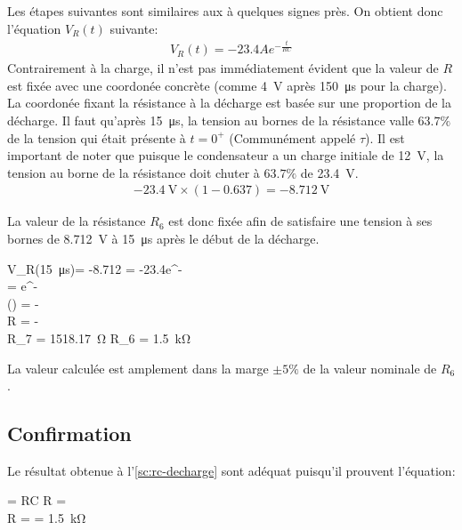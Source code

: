 \documentclass[a11paper, 11pt]{article}
\newcommand{\vrt}{V_R(t)}
\begin{document}
\begin{appendix}
	Les étapes suivantes sont similaires aux 
	à quelques signes près.
	On obtient donc l'équation $V_R(t)$ suivante:
	\begin{gather}
		\vrt = -23.4Ae^{-\frac{t}{RC}} \label{eq:rc-decharge-final}
	\end{gather}
	Contrairement à la charge, il n'est pas immédiatement évident que la valeur de $R$ est
	fixée avec une coordonée concrète (comme \SI{4}{\V} après \SI{150}{\us} pour la charge).
	La coordonée fixant la résistance à la décharge est basée sur une proportion de la décharge.
	Il faut qu'après \SI{15}{\us}, la tension au bornes de la résistance valle $63.7\%$ de la
	tension qui était présente à $t=0^+$ (Communément appelé $\tau$).
	Il est important de noter que puisque le condensateur a
	un charge initiale de \SI{12}{\V}, la tension au borne de la résistance doit chuter à
	$63.7\%$ de \SI{23.4}{\V}.
	\begin{gather}
		\SI{-23.4}{\V} \times (1-0.637) = \SI{-8.712}{\V}
	\end{gather}

	La valeur de la résistance $R_6$ est donc fixée afin de satisfaire une tension à ses bornes
	de \SI{8.712}{\V} à \SI{15}{\us} après le début de la décharge.
	\begin{DispWithArrows}[format=c]
		V_R(\SI{15}{\us})= -8.712 = -23.4e^{-}\\
		 = e^{-}\\
		\ln() = -\\
		R = - \\
		R_7 = \SI{1518.17}{\ohm}  R_6 = \SI{1.5}{\kohm}
	\end{DispWithArrows}

	La valeur calculée est amplement dans la marge $\pm 5\%$ de la valeur nominale de $R_6$.


	\subsection{Confirmation}
	Le résultat obtenue à l'\cref{sc:rc-decharge} sont adéquat puisqu'il prouvent l'équation:
	\begin{DispWithArrows}[format=c]
		\tau = RC \Rightarrow R = \\
		R =  = \SI{1.5}{\kohm}
	\end{DispWithArrows}


\end{appendix}
\end{document}
